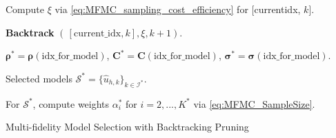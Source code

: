 \begin{algorithm}[!ht]
{{{     %

     

        
        Compute $\xi$ via \eqref{eq:MFMC_sampling_cost_efficiency} for  
      [current\textunderscore idx, $k$].

      
      \textbf{Backtrack} $(\, [\text{current}\_\text{idx},k],\xi, k+1)$.
  }
}
}
\vspace{3mm} 


 
$\boldsymbol{\rho}^* = \boldsymbol{\rho} (\text{idx}\_\text{for}\_\text{model})$, $\boldsymbol{C}^* = \boldsymbol{C} (\text{idx}\_\text{for}\_\text{model})$, $\boldsymbol{\sigma}^* = \boldsymbol{\sigma} (\text{idx}\_\text{for}\_\text{model})$.

Selected models $\mathcal{S}^* = \{\widehat u_{h,k}\}_{k\in \mathcal{I^*}}$.

For $\mathcal{S}^*$, compute weights $\alpha_i^*$ for $i=2,...,K^*$ via \eqref{eq:MFMC_SampleSize}.




\caption{Multi-fidelity Model Selection with Backtracking Pruning}
\end{algorithm}
\ULforem




